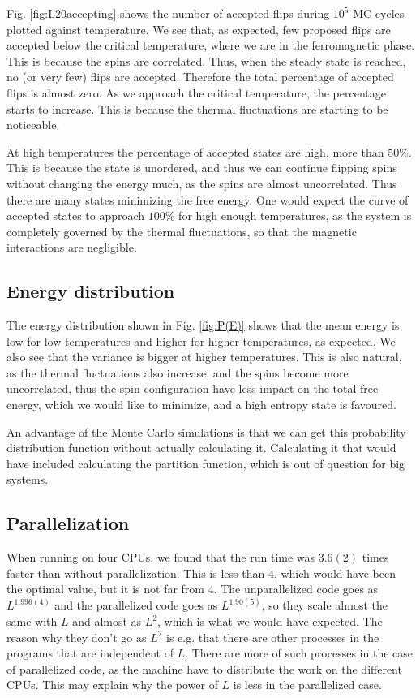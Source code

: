 \documentclass[%
 reprint,
nofootinbib,
aps,
]{revtex4-1}
\begin{document}
Fig. \vref{fig:L20accepting} shows the number of accepted flips during $10^5$ MC cycles plotted against temperature. We see that, as expected, few proposed flips are accepted below the critical temperature, where we are in the ferromagnetic phase. This is because the spins are correlated. Thus, when the steady state is reached, no (or very few) flips are accepted. Therefore the total percentage of accepted flips is almost zero. As we approach the critical temperature, the percentage starts to increase. This is because the thermal fluctuations are starting to be noticeable.

At high temperatures the percentage of accepted states are high, more than $50\%$. This is because the state is unordered, and thus we can continue flipping spins without changing the energy much, as the spins are almost uncorrelated. Thus there are many states minimizing the free energy. One would expect the curve of accepted states to approach $100\%$ for high enough temperatures, as the system is completely governed by the thermal fluctuations, so that the magnetic interactions are negligible.


\subsection{Energy distribution}

The energy distribution shown in Fig. \vref{fig:P(E)} shows that the mean energy is low for low temperatures and higher for higher temperatures, as expected. We also see that the variance is bigger at higher temperatures. This is also natural, as the thermal fluctuations also increase, and the spins become more uncorrelated, thus the spin configuration have less impact on the total free energy, which we would like to minimize, and a high entropy state is favoured.

An advantage of the Monte Carlo simulations is that we can get this probability distribution function without actually calculating it. Calculating it that would have included calculating the partition function, which is out of question for big systems. 


\subsection{Parallelization}

When running on four CPUs, we found that the run time was $3.6(2)$ times faster than without parallelization. This is less than $4$, which would have been the optimal value, but it is not far from $4$. The unparallelized code goes as $L^{1.996(4)}$ and the parallelized code goes as $L^{1.90(5)}$, so they scale almost the same with $L$ and almost as $L^2$, which is what we would have expected. The reason why they don't go as $L^2$ is e.g. that there are other processes in the programs that are independent of $L$. There are more of such processes in the case of parallelized code, as the machine have to distribute the work on the different CPUs. This may explain why the power of $L$ is less in the parallelized case.
\end{document}
